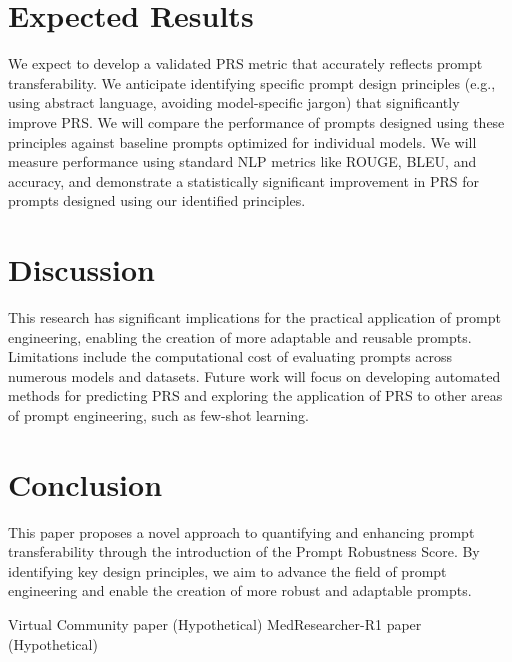 \documentclass{article}
\begin{document}
\section{Expected Results}
We expect to develop a validated PRS metric that accurately reflects prompt transferability. We anticipate identifying specific prompt design principles (e.g., using abstract language, avoiding model-specific jargon) that significantly improve PRS. We will compare the performance of prompts designed using these principles against baseline prompts optimized for individual models. We will measure performance using standard NLP metrics like ROUGE, BLEU, and accuracy, and demonstrate a statistically significant improvement in PRS for prompts designed using our identified principles.

\section{Discussion}
This research has significant implications for the practical application of prompt engineering, enabling the creation of more adaptable and reusable prompts. Limitations include the computational cost of evaluating prompts across numerous models and datasets. Future work will focus on developing automated methods for predicting PRS and exploring the application of PRS to other areas of prompt engineering, such as few-shot learning.

\section{Conclusion}
This paper proposes a novel approach to quantifying and enhancing prompt transferability through the introduction of the Prompt Robustness Score. By identifying key design principles, we aim to advance the field of prompt engineering and enable the creation of more robust and adaptable prompts.


\begin{thebibliography}{9}
\bibitem{} Virtual Community paper (Hypothetical)
\bibitem{} MedResearcher-R1 paper (Hypothetical)
\end{thebibliography}
\end{document}
